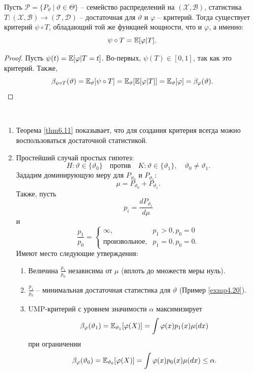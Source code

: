 \begin{thm} \label{thm6.11}
	Пусть $\mathcal{P} = \{P_\vartheta\ |\ \vartheta \in \Theta  \}$ -- семейство распределений на $(\mathcal{X}, \mathcal{B})$, статистика $T:(\mathcal{X}, \mathcal{B}) \rightarrow (\mathcal{T}, \mathcal{D})$ -- достаточная для $\vartheta$ и $\varphi$ -- критерий. Тогда существует критерий $\psi \circ T$, обладающий той же функцией мощности, что и $\varphi$, а именно:
	\[ \psi \circ T = \mathbb{E}[\varphi | T]. \]
\end{thm}
\begin{proof}
	Пусть $\psi(t) = \mathbb{E}[\varphi | T = t]$. Во-первых, $\psi(T) \in [0, 1]$, так как это критерий. Также,
	\[ \beta_{\psi \circ T}(\vartheta) = \mathbb{E}_\vartheta[\psi \circ T] = \mathbb{E}_\vartheta[\mathbb{E}[\varphi | T ]] = \mathbb{E}_\vartheta[\varphi] = \beta_\varphi(\vartheta). \]
\end{proof}

\begin{rmrk} \
	\begin{enumerate}
		\item Теорема \ref{thm6.11} показывает, что для создания критерия всегда можно воспользоваться достаточной статистикой.
		\item Простейший случай простых гипотез:
		\[ H:\vartheta \in \{\vartheta_0 \}\quad \text{против} \quad K:\vartheta \in \{\vartheta_1 \}, \quad \vartheta_0 \neq \vartheta_1. \]
		Зададим доминирующую меру для $P_{\vartheta_0}$ и $P_{\vartheta_1}$:
		\[\mu = P_{\vartheta_0} + P_{\vartheta_1}. \]
		Также, пусть
		\[ p_i = \frac{dP_{\vartheta_i}}{d\mu} \]
		и 
		\[ \frac{p_1}{p_0} = 
		\left \{
		\begin{array}{cl}
		\infty, & p_1 > 0, p_0 = 0 \\
		\text{произвольное}, & p_1 = 0, p_0 = 0.
		\end{array}
		\right.
		\]
		Имеют место следующие утверждения:
		\begin{enumerate}
			\item Величина $\frac{p_1}{p_0}$ независима от $\mu$ (вплоть до множеств меры нуль).
			\item $\frac{p_1}{p_0}$ -- минимальная достаточная статистика для $\vartheta$ (Пример \ref{exmp4.20}).
			\item UMP-критерий с уровнем значимости $\alpha$ максимизирует
			\[ \beta_\varphi(\vartheta_1) = \mathbb{E}_{\vartheta_1}[\varphi(X)] = \int \varphi(x) p_1(x) \mu(dx) \]
			при ограничении
			\[ \beta_\varphi(\vartheta_0) = \mathbb{E}_{\vartheta_0}[\varphi(X)] = \int \varphi(x) p_0(x) \mu(dx) \leq \alpha. \]
		\end{enumerate}
	\end{enumerate}
\end{rmrk}

